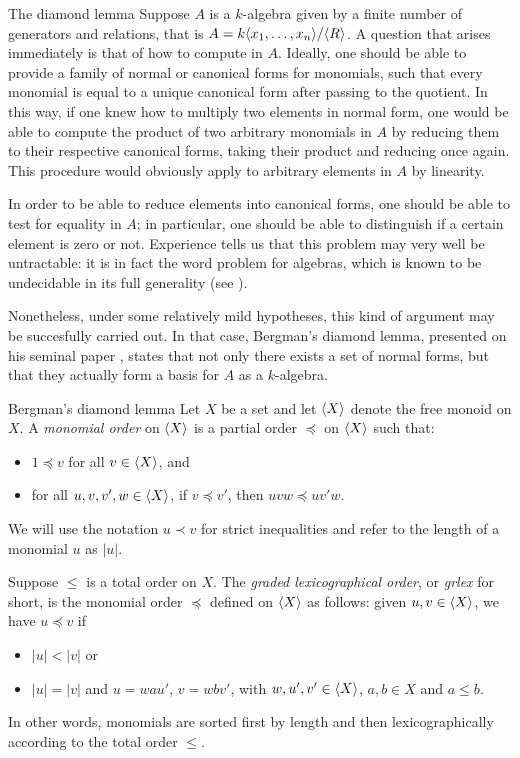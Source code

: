 \begin{chapter}{The diamond lemma}
Suppose $A$ is a $k$-algebra given by a finite number of generators and relations, that is $A=k\langle x_1,\dots,x_n\rangle/\langle R\rangle$. A question that arises immediately is that of how to compute in $A$. Ideally, one should be able to provide a family of normal or canonical forms for monomials, such that every monomial is equal to a unique canonical form after passing to the quotient. In this way, if one knew how to multiply two elements in normal form, one would be able to compute the product of two arbitrary monomials in $A$ by reducing them to their respective canonical forms, taking their product and reducing once again. This procedure would obviously apply to arbitrary elements in $A$ by linearity.

In order to be able to reduce elements into canonical forms, one should be able to test for equality in $A$; in particular, one should be able to distinguish if a certain element is zero or not. Experience tells us that this problem may very well be untractable: it is in fact the word problem for algebras, which is known to be undecidable in its full generality (see \cite{Sti82}).

Nonetheless, under some relatively mild hypotheses, this kind of argument may be succesfully carried out. In that case, Bergman's diamond lemma, presented on his seminal paper \cite{Ber78}, states that not only there exists a set of normal forms, but that they actually form a basis for $A$ as a $k$-algebra.

\begin{section}{Bergman's diamond lemma}
Let $X$ be a set and let $\langle X\rangle$ denote the free monoid on $X$. A \emph{monomial order} on $\langle X\rangle$ is a partial order $\preceq$ on $\langle X\rangle$ such that:
\begin{itemize}
\item $1\preceq v$ for all $v\in \langle X\rangle$, and
\item for all $u,v,v',w\in \langle X\rangle$, if $v\preceq v'$, then $uvw\preceq uv'w$.
\end{itemize}
We will use the notation $u\prec v$ for strict inequalities and refer to the length of a monomial $u$ as $|u|$.
\begin{exmp} Suppose $\leq$ is a total order on $X$. The \emph{graded lexicographical order}, or \emph{grlex} for short, is the monomial order $\preceq$ defined on $\langle X\rangle$ as follows: given $u,v\in \langle X\rangle$, we have $u\preceq v$ if
\begin{itemize}
\item $|u| < |v|$ or
\item $|u| = |v|$ and $u=wau'$, $v=wbv'$, with $w,u',v'\in \langle X\rangle$, $a,b\in X$ and $a\leq b$.
\end{itemize}
In other words, monomials are sorted first by length and then lexicographically according to the total order $\leq$.
\end{exmp}


\end{section}
\end{chapter}
